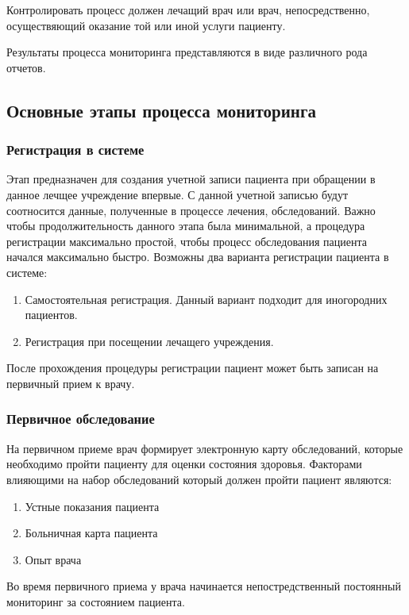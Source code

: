 Контролировать процесс должен лечащий врач или врач, непосредственно, осуществяющий оказание той или иной услуги пациенту.

Результаты процесса мониторинга представляются в виде различного рода отчетов.

\subsection{Основные этапы процесса мониторинга}

\subsubsection{Регистрация в системе}

Этап предназначен для создания учетной записи пациента при обращении в данное
лечщее учреждение впервые. С данной учетной записью будут соотносится данные,
полученные в процессе лечения, обследований. Важно чтобы продолжительность
данного этапа была минимальной, а процедура регистрации максимально простой,
чтобы процесс обследования пациента начался максимально быстро.
Возможны два варианта регистрации пациента в системе:

\begin{enumerate}
  \item Самостоятельная регистрация. Данный вариант подходит для иногородних
  пациентов.
  \item Регистрация при посещении лечащего учреждения.
\end{enumerate}

После прохождения процедуры регистрации пациент может быть записан на первичный
прием к врачу.

\subsubsection{Первичное обследование}

На первичном приеме врач формирует электронную карту обследований, которые
необходимо пройти пациенту для оценки состояния здоровья. Факторами влияющими на
набор обследований который должен пройти пациент являются:
\begin{enumerate}
  \item Устные показания пациента
  \item Больничная карта пациента
  \item Опыт врача   
\end{enumerate}

Во время первичного приема у врача начинается непостредственный постоянный
мониторинг за состоянием пациента.

